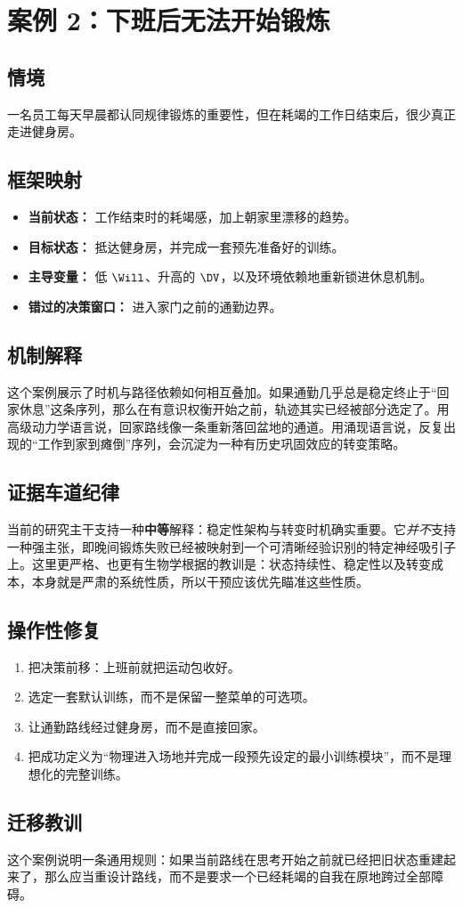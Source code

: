 \section{案例 2：下班后无法开始锻炼}

\subsection*{情境}
一名员工每天早晨都认同规律锻炼的重要性，但在耗竭的工作日结束后，很少真正走进健身房。

\subsection*{框架映射}
\begin{itemize}[nosep]
  \item \textbf{当前状态：} 工作结束时的耗竭感，加上朝家里漂移的趋势。
  \item \textbf{目标状态：} 抵达健身房，并完成一套预先准备好的训练。
  \item \textbf{主导变量：} 低 $\Will$、升高的 $\DV$，以及环境依赖地重新锁进休息机制。
  \item \textbf{错过的决策窗口：} 进入家门之前的通勤边界。
\end{itemize}

\subsection*{机制解释}
这个案例展示了时机与路径依赖如何相互叠加。如果通勤几乎总是稳定终止于“回家休息”这条序列，那么在有意识权衡开始之前，轨迹其实已经被部分选定了。用高级动力学语言说，回家路线像一条重新落回盆地的通道。用涌现语言说，反复出现的“工作到家到瘫倒”序列，会沉淀为一种有历史巩固效应的转变策略。

\subsection*{证据车道纪律}
当前的研究主干支持一种\textbf{中等}解释：稳定性架构与转变时机确实重要。它\emph{并不}支持一种强主张，即晚间锻炼失败已经被映射到一个可清晰经验识别的特定神经吸引子上。这里更严格、也更有生物学根据的教训是：状态持续性、稳定性以及转变成本，本身就是严肃的系统性质，所以干预应该优先瞄准这些性质。

\subsection*{操作性修复}
\begin{enumerate}[nosep]
  \item 把决策前移：上班前就把运动包收好。
  \item 选定一套默认训练，而不是保留一整菜单的可选项。
  \item 让通勤路线经过健身房，而不是直接回家。
  \item 把成功定义为“物理进入场地并完成一段预先设定的最小训练模块”，而不是理想化的完整训练。
\end{enumerate}

\subsection*{迁移教训}
这个案例说明一条通用规则：如果当前路线在思考开始之前就已经把旧状态重建起来了，那么应当重设计路线，而不是要求一个已经耗竭的自我在原地跨过全部障碍。